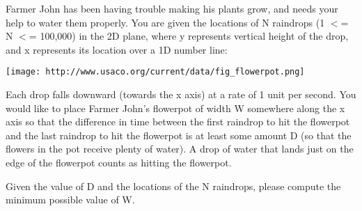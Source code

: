 Farmer John has been having trouble making his plants grow, and needs your help to water them properly.  You are given the locations of N raindrops   (1 $<$= N $<$= 100,000) in the 2D plane, where y represents vertical height of the drop, and x represents its location over a 1D number line: 


\texttt{[image: http://www.usaco.org/current/data/fig\_flowerpot.png]}

Each drop falls downward (towards the x axis) at a rate of 1 unit per second.  You would like to place Farmer John's flowerpot of width W somewhere along the x axis so that the difference in time between the first raindrop to hit the flowerpot and the last raindrop to hit the flowerpot is at least some amount D (so that the flowers in the pot receive plenty of water).  A drop of water that lands just on the edge of the flowerpot counts as hitting the flowerpot.

Given the value of D and the locations of the N raindrops, please compute the minimum possible value of W.